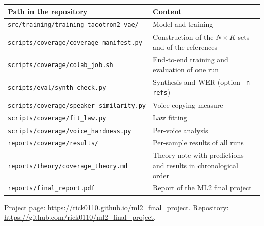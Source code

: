 \documentclass[a4paper,11pt]{article}
\begin{document}
\begin{table}[H]
\centering\small
\begin{tabular}{@{}p{7.6cm}p{8cm}@{}}
\toprule
Path in the repository & Content\\
\midrule
\texttt{src/training/training-tacotron2-vae/} & Model and training\\
\texttt{scripts/coverage/coverage\_manifest.py} & Construction of the $N\times K$ sets and of the references\\
\texttt{scripts/coverage/colab\_job.sh} & End-to-end training and evaluation of one run\\
\texttt{scripts/eval/synth\_check.py} & Synthesis and WER (option \texttt{--n-refs})\\
\texttt{scripts/coverage/speaker\_similarity.py} & Voice-copying measure\\
\texttt{scripts/coverage/fit\_law.py} & Law fitting\\
\texttt{scripts/coverage/voice\_hardness.py} & Per-voice analysis\\
\texttt{reports/coverage/results/} & Per-sample results of all runs\\
\texttt{reports/theory/coverage\_theory.md} & Theory note with predictions and results in chronological order\\
\texttt{reports/final\_report.pdf} & Report of the ML2 final project\\
\bottomrule
\end{tabular}
\end{table}

Project page: \url{https://rick0110.github.io/ml2_final_project}. Repository: \url{https://github.com/rick0110/ml2_final_project}.
\end{document}
